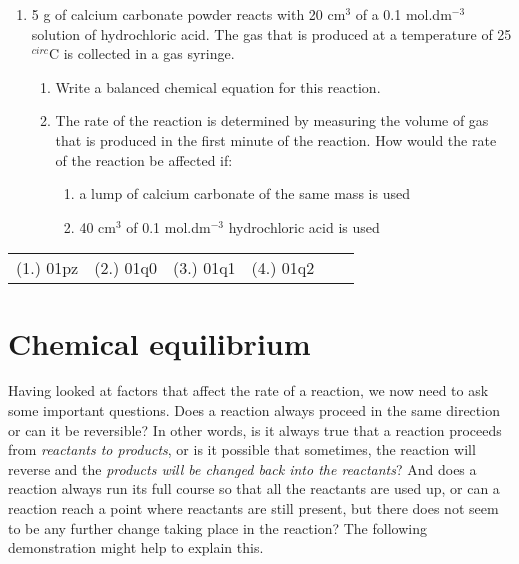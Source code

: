 {\begin{enumerate}
\item{5 g of calcium carbonate powder reacts with 20 cm$^{3}$ of a 0.1 mol.dm$^{-3}$ solution of hydrochloric acid. The gas that is produced at a temperature of 25$^{circ}$C is collected in a gas syringe.}
	\begin{enumerate}
	\item{Write a balanced chemical equation for this reaction.}
	\item{The rate of the reaction is determined by measuring the volume of gas that is produced in the first minute of the reaction. How would the rate of the reaction be affected if:}
		\begin{enumerate}
		\item{a lump of calcium carbonate of the same mass is used}
		\item{40 cm$^{3}$ of 0.1 mol.dm$^{-3}$ hydrochloric acid is used}
		\end{enumerate} 
	\end{enumerate}

\end{enumerate}

\par \practiceinfo
\par \begin{tabular}[h]{cccccc}
(1.)	01pz	&
(2.)	01q0	&
(3.)	01q1	&
(4.)	01q2	&
\end{tabular}

}







\section{Chemical equilibrium}
\label{sec:reactionrates:equilibrium}

Having looked at factors that affect the rate of a reaction, we now need to ask some important questions. Does a reaction always proceed in the same direction or can it be reversible? In other words, is it always true that a reaction proceeds from \textit{reactants to products}, or is it possible that sometimes, the reaction will reverse and the \textit{products will be changed back into the reactants}? And does a reaction always run its full course so that all the reactants are used up, or can a reaction reach a point where reactants are still present, but there does not seem to be any further change taking place in the reaction? The following demonstration might help to explain this.

